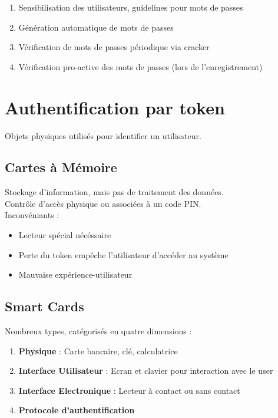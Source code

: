 \documentclass{report}
\begin{document}
			\begin{enumerate}
				\item Sensibilisation des utilisateurs, guidelines pour mots de passes
				\item Génération automatique de mots de passes
				\item Vérification de mots de passes périodique via cracker
				\item Vérification pro-active des mots de passes (lors de l'enregistrement)\\
			\end{enumerate}

	\section{Authentification par token}

		Objets physiques utilisés pour identifier un utilisateur.\\

		\subsection{Cartes à Mémoire}

			Stockage d'information, mais pas de traitement des données.\\

			Contrôle d'accès physique ou associées à un code PIN.\\

			Inconvéniants : \\

			\begin{itemize}
				\item Lecteur spécial nécéssaire
				\item Perte du token empêche l'utilisateur d'accéder au système
				\item Mauvaise expérience-utilisateur\\
			\end{itemize}

		\subsection{Smart Cards}

			Nombreux types, catégorisés en quatre dimensions : \\

			\begin{enumerate}
				\item \textbf{Physique} : Carte bancaire, clé, calculatrice
				\item \textbf{Interface Utilisateur} : Ecran et clavier pour interaction avec le user
				\item \textbf{Interface Electronique} : Lecteur à contact ou sans contact
				\item \textbf{Protocole d'authentification}\\
			\end{enumerate}
\end{document}
